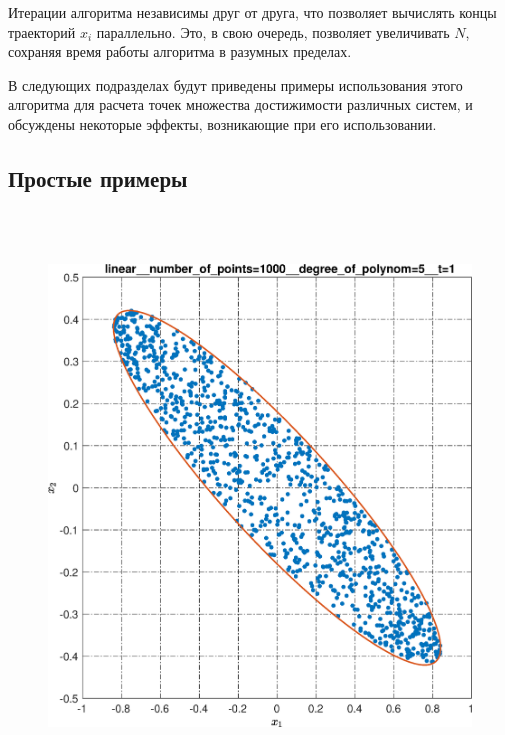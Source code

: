 \documentclass[../main.tex]{subfiles}
\begin{document}
 Итерации алгоритма независимы друг от друга, что позволяет вычислять концы траекторий $x_i$ параллельно. 
 Это, в свою очередь, позволяет увеличивать $N$, сохраняя время работы алгоритма в разумных пределах.
 
 В следующих подразделах будут приведены примеры использования этого алгоритма для расчета точек множества достижимости различных систем, и обсуждены некоторые эффекты, возникающие при его использовании.
 
 \subsection{Простые примеры}
 \begin{figure}[ht!] 
 	\hspace{-2.5ex}
 	\begin{minipage}[b]{.3\linewidth} 
 		\small
 		\centering 
 		\includegraphics[width=\linewidth]{images/linear__number_of_points=1000__degree_of_polynom=5__t=1.eps}
 		\label{fig:ap:linearN103k5T1} 
 	\end{minipage}
 	\hfill
 	\begin{minipage}[b]{.3\linewidth} 
 		\small
 		\centering

\end{minipage}
\end{figure}
\end{document}
